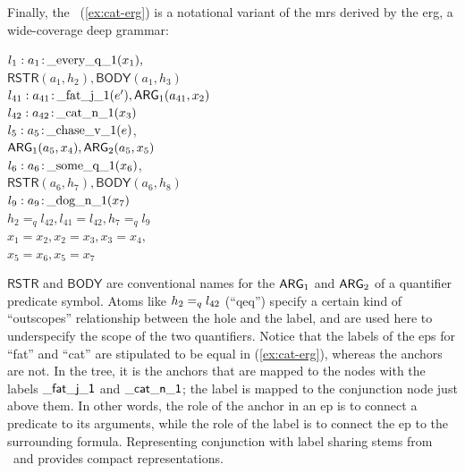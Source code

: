 Finally, the \rmrs\ (\ref{ex:cat-erg}) is a notational variant of the
{\sc mrs} derived by the {\sc erg}, a wide-coverage deep grammar:
\begin{examples}
\item $l_1:a_1\colon\!\mathrm{\_every\_q\_1}(x_1),$\\
\hspace*{0.1in}$\mathsf{RSTR}(a_1,h_2),
\mathsf{BODY}(a_1,h_3)$\\ 
$l_{41}:a_{41}\colon\!\mathrm{\_fat\_j\_1}(e'), \mathsf{ARG}_1(a_{41},x_2)$\\
$l_{42}:a_{42}\colon\!\mathrm{\_cat\_n\_1}(x_3)$\\
$l_5:a_5\colon\!\mathrm{\_chase\_v\_1}(e)$,\\
\hspace*{0.1in}$\mathsf{ARG}_1(a_5,x_4),
\mathsf{ARG}_2(a_5,x_5)$\\ 
$l_6:a_6\colon\!\mathrm{\_some\_q\_1}(x_6)$,\\
\hspace*{0.1in}$\mathsf{RSTR}(a_6,h_7),
\mathsf{BODY}(a_6,h_8)$\\ 
$l_9:a_9\colon\!\mathrm{\_dog\_n\_1}(x_7)$\\
$h_2=_q l_{42}, l_{41}=l_{42}, h_7 =_q l_9$\\
$x_1=x_2, x_2=x_3, x_3=x_4,$\\
$x_5=x_6, x_5=x_7$
\label{ex:cat-erg}
\end{examples}

$\mathsf{RSTR}$ and $\mathsf{BODY}$ are conventional names
for the $\mathsf{ARG}_1$ and $\mathsf{ARG}_2$ of a quantifier predicate symbol.  Atoms
like $h_2 =_q l_{42}$ (``qeq'') specify a certain kind of
``outscopes'' relationship between the hole and the label, and are
used here to underspecify the scope of the two quantifiers.
Notice that the labels of the {\sc ep}s for ``fat'' and ``cat'' are
stipulated to be equal in (\ref{ex:cat-erg}), whereas the anchors are not.  In
the tree, it is the anchors that are mapped to the nodes with the
labels $\mathsf{\_fat\_j\_1}$ and $\mathsf{\_cat\_n\_1}$; the label is
mapped to the conjunction node just above them.  In other words, the
role of the anchor in an {\sc ep} is to connect a predicate to its
arguments, while the role of the label is to connect the {\sc ep} to
the surrounding formula.  Representing conjunction with label sharing
stems from \mrs\ and provides compact representations.

